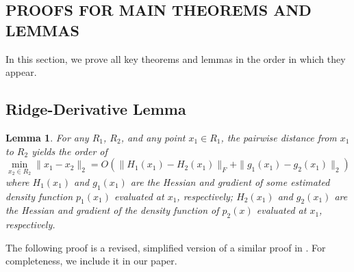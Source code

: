 \documentclass[aos,preprint]{imsart}
\newtheorem{lemma}[theorem]{Lemma}
\theoremstyle{remark}
\begin{document}
\begin{appendix}
\section{PROOFS FOR MAIN THEOREMS AND LEMMAS}
In this section, we prove all key theorems and lemmas in the order in which they appear.
\subsection{Ridge-Derivative Lemma}
\begin{lemma}{ 
For any $R_1$, $R_2$, and any point $x_1\in R_1$, the pairwise distance from $x_1$ to $R_2$ yields the order of %
\[
\min_{x_2\in R_2}\|x_1-x_2\|_2 = O(\|H_1(x_1)-H_2(x_1)\|_F+\|g_1(x_1)-g_2(x_1)\|_2)
\]
where $H_1(x_1)$ and $g_1 (x_1)$ are the Hessian and gradient of some estimated density function $p_1(x_1)$ evaluated at $x_1$, respectively; $H_2(x_1)$ and $g_2(x_1)$ are the Hessian and gradient of the density function of $p_2(x)$ evaluated at $x_1$, respectively.
 }\label{margin}
\end{lemma}


The following proof is a revised, simplified version of a similar proof in \cite{genovese2014nonparametric}. For completeness, we include it in our paper.



\end{appendix}
\end{document}
